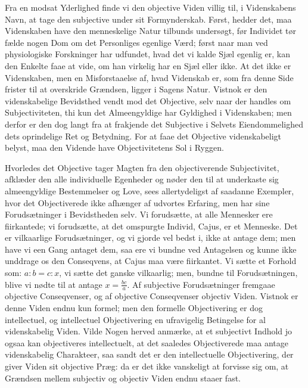 \documentclass[12pt]{book}
\newcommand{\apage}[1]{\marginnote{\footnotesize\textit{[#1]}}}
\begin{document}
Fra en modsat Yderlighed finde vi den objective Viden villig til, i
Videnskabens Navn, at tage den subjective under sit Formynderskab.
Først, hedder det, maa Videnskaben have den menneskelige Natur tilbunds
undersøgt, før Individet tør fælde nogen Dom om det Personliges egenlige
Værd; først naar man ved physiologiske Forskninger har udfundet, hvad
det vi kalde \apage{44} Sjæl egenlig er, kan den Enkelte faae at vide, om han
virkelig har en Sjæl eller ikke. At det ikke er Videnskaben, men en
Misforstaaelse af, hvad Videnskab er, som fra denne Side frister til at
overskride Grændsen, ligger i Sagens Natur. Vistnok er den
videnskabelige Bevidsthed vendt mod det Objective, selv naar der handles
om Subjectiviteten, thi kun det Almeengyldige har Gyldighed i
Videnskaben; men derfor er den dog langt fra at frakjende det Subjective
i Selvets Eiendommelighed dets oprindelige Ret og Betydning. For at
faae det Objective videnskabeligt belyst, maa den Vidende have
Objectivitetens Sol i Ryggen.

Hvorledes det Objective tager Magten fra den objectiverende
Subjectivitet, afklæder den alle individuelle Egenheder og nøder den
til at underkaste sig almeengyldige Bestemmelser og Love, sees
allertydeligst af saadanne Exempler, hvor det Objectiverede ikke afhænger
af udvortes Erfaring, men har sine Forudsætninger i Bevidstheden selv.
Vi forudsætte, at alle Mennesker ere fiirkantede; vi forudsætte, at
det omspurgte Individ, Cajus, er et Menneske. Det er vilkaarlige
Forudsætninger, og vi gjorde vel bedst i, ikke at antage dem; men have
vi een Gang antaget dem, saa ere vi bundne ved Antagelsen og kunne
ikke unddrage os den Conseqvens, at Cajus maa være fiirkantet. Vi
sætte et Forhold som: $a : b = c : x$, vi sætte det ganske vilkaarlig;
men, bundne til Forudsætningen, blive vi nødte til at antage
$x = \frac{bc}{a}$. Af subjective Forudsætninger fremgaae objective  \apage{45}
Conseqvenser, og af objective Conseqvenser objectiv Viden. Vistnok er
denne Viden endnu kun formel; men den formelle Objectivering er dog
intellectuel, og intellectuel Objectivering en ufravigelig Betingelse
for al videnskabelig Viden. Vilde Nogen herved anmærke, at et subjectivt
Indhold jo ogsaa kan objectiveres intellectuelt, at det saaledes
Objectiverede maa antage videnskabelig Charakteer, saa sandt det er
den intellectuelle Objectivering, der giver Viden sit objective Præg:
da er det ikke vanskeligt at forvisse sig om, at Grændsen mellem
subjectiv og objectiv Viden endnu staaer fast.
\end{document}
